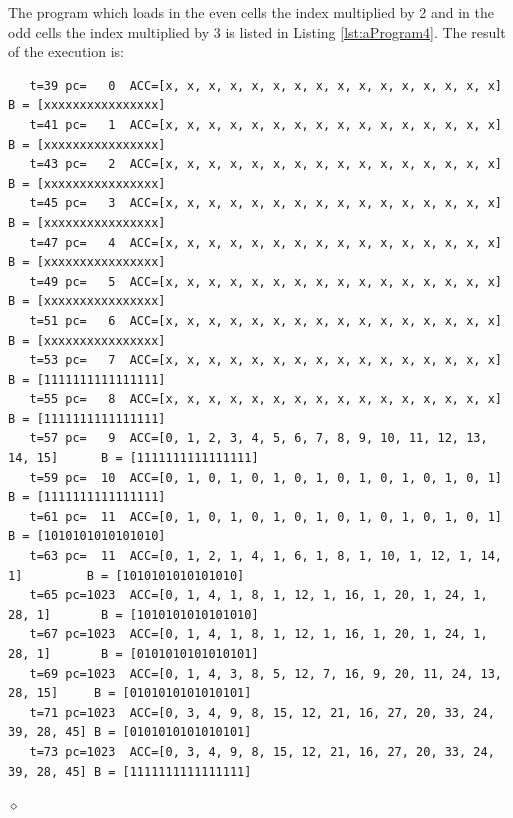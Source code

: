 \begin{exemplu}
The program which loads in the even cells the index multiplied by 2 and in the odd cells the index multiplied by 3 is listed in Listing \ref{lst:aProgram4}.
{\em 
{}
}
The result of the execution is:
{\scriptsize
\begin{verbatim}
   t=39 pc=   0  ACC=[x, x, x, x, x, x, x, x, x, x, x, x, x, x, x, x]            B = [xxxxxxxxxxxxxxxx]
   t=41 pc=   1  ACC=[x, x, x, x, x, x, x, x, x, x, x, x, x, x, x, x]            B = [xxxxxxxxxxxxxxxx]
   t=43 pc=   2  ACC=[x, x, x, x, x, x, x, x, x, x, x, x, x, x, x, x]            B = [xxxxxxxxxxxxxxxx]
   t=45 pc=   3  ACC=[x, x, x, x, x, x, x, x, x, x, x, x, x, x, x, x]            B = [xxxxxxxxxxxxxxxx]
   t=47 pc=   4  ACC=[x, x, x, x, x, x, x, x, x, x, x, x, x, x, x, x]            B = [xxxxxxxxxxxxxxxx]
   t=49 pc=   5  ACC=[x, x, x, x, x, x, x, x, x, x, x, x, x, x, x, x]            B = [xxxxxxxxxxxxxxxx]
   t=51 pc=   6  ACC=[x, x, x, x, x, x, x, x, x, x, x, x, x, x, x, x]            B = [xxxxxxxxxxxxxxxx]
   t=53 pc=   7  ACC=[x, x, x, x, x, x, x, x, x, x, x, x, x, x, x, x]            B = [1111111111111111]
   t=55 pc=   8  ACC=[x, x, x, x, x, x, x, x, x, x, x, x, x, x, x, x]            B = [1111111111111111]
   t=57 pc=   9  ACC=[0, 1, 2, 3, 4, 5, 6, 7, 8, 9, 10, 11, 12, 13, 14, 15]      B = [1111111111111111]
   t=59 pc=  10  ACC=[0, 1, 0, 1, 0, 1, 0, 1, 0, 1, 0, 1, 0, 1, 0, 1]            B = [1111111111111111]
   t=61 pc=  11  ACC=[0, 1, 0, 1, 0, 1, 0, 1, 0, 1, 0, 1, 0, 1, 0, 1]            B = [1010101010101010]
   t=63 pc=  11  ACC=[0, 1, 2, 1, 4, 1, 6, 1, 8, 1, 10, 1, 12, 1, 14, 1]         B = [1010101010101010]
   t=65 pc=1023  ACC=[0, 1, 4, 1, 8, 1, 12, 1, 16, 1, 20, 1, 24, 1, 28, 1]       B = [1010101010101010]
   t=67 pc=1023  ACC=[0, 1, 4, 1, 8, 1, 12, 1, 16, 1, 20, 1, 24, 1, 28, 1]       B = [0101010101010101]
   t=69 pc=1023  ACC=[0, 1, 4, 3, 8, 5, 12, 7, 16, 9, 20, 11, 24, 13, 28, 15] 	  B = [0101010101010101]
   t=71 pc=1023  ACC=[0, 3, 4, 9, 8, 15, 12, 21, 16, 27, 20, 33, 24, 39, 28, 45] B = [0101010101010101]
   t=73 pc=1023  ACC=[0, 3, 4, 9, 8, 15, 12, 21, 16, 27, 20, 33, 24, 39, 28, 45] B = [1111111111111111]
\end{verbatim}
}

$\diamond$
\end{exemplu}


